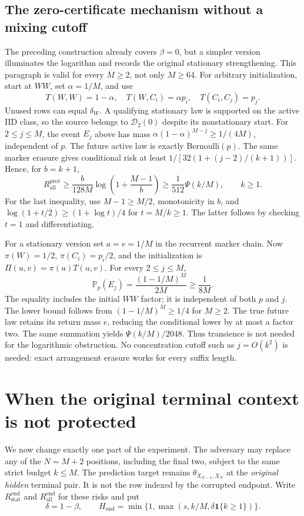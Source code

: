 \subsection{The zero-certificate mechanism without a mixing cutoff}
The preceding construction already covers $\beta=0$, but a simpler
version illuminates the logarithm and records the original stationary
strengthening.  This paragraph is valid for every $M\geq2$, not only
$M\geq64$.
For arbitrary initialization, start at $WW$, set $\alpha=1/M$, and use
\[
 T(W,W)=1-\alpha,\quad T(W,C_i)=\alpha p_i,
 \quad T(C_i,C_j)=p_j.
\]
Unused rows can equal $\delta_W$.  A qualifying stationary law is
supported on the active IID class, so the source belongs to
$\mathcal D_2(0)$ despite its nonstationary start.  For
$2\leq j\leq M$, the event $E_j$ above has mass
$\alpha(1-\alpha)^{M-j}\geq1/(4M)$, independent of $p$.
The future active law is exactly Bernoulli$(p)$.
The same marker erasure gives conditional risk at least
$1/[32(1+(j-2)/(k+1))]$.  Hence, for $b=k+1$,
\[
 R_{\mathrm{all}}^{\mathrm{prot}}
 \geq\frac b{128M}\log\left(1+\frac{M-1}{b}\right)
 \geq\frac1{512}\Psi(k/M),\qquad k\geq1.
\]
For the last inequality, use $M-1\geq M/2$, monotonicity in $b$, and
$\log(1+t/2)\geq(1+\log t)/4$ for $t=M/k\geq1$.
The latter follows by checking $t=1$ and differentiating.

For a stationary version set $a=e=1/M$ in the recurrent marker chain.
Now $\pi(W)=1/2$, $\pi(C_i)=p_i/2$, and the initialization is
$\Pi(u,v)=\pi(u)T(u,v)$.  For every $2\leq j\leq M$,
\[
 \mathbb P_p(E_j)
 =\frac{(1-1/M)^M}{2M}\geq\frac1{8M}.
\]
The equality includes the initial $WW$ factor; it is independent of
both $p$ and $j$.  The lower bound follows from
$(1-1/M)^M\geq1/4$ for $M\geq2$.
The true future law retains its return mass $e$, reducing the
conditional lower by at most a factor two.  The same summation yields
$\Psi(k/M)/2048$.  Thus transience is not needed for the logarithmic
obstruction.  No concentration cutoff such as $j=O(k^2)$ is needed:
exact arrangement erasure works for every suffix length.

\section{When the original terminal context is not protected}
\label{sec:endpoint}
We now change exactly one part of the experiment.  The adversary may
replace any of the $N=M+2$ positions, including the final two, subject
to the same strict budget $k\leq M$.  The prediction target remains
$\theta_{X_{N-1},X_N}$ at the \emph{original hidden} terminal pair.
It is not the row indexed by the corrupted endpoint.  Write
$R_{\mathrm{stat}}^{\mathrm{end}}$ and
$R_{\mathrm{all}}^{\mathrm{end}}$ for these risks and put
\[
 \delta=1-\beta,\qquad
 H_{\mathrm{end}}=\min\{1,\max(s,k/M,\delta\mathbf1\{k\geq1\})\}.
\]

